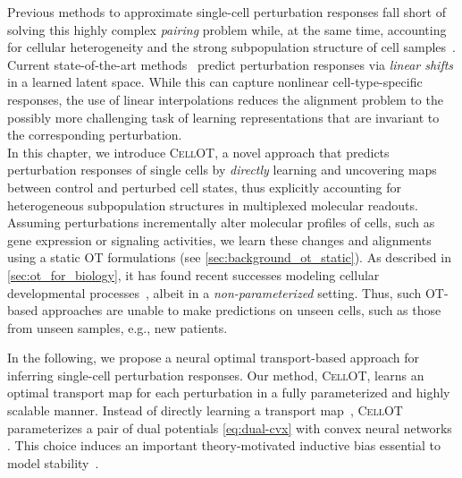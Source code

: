  Previous methods to approximate single-cell perturbation responses fall short of solving this highly complex \emph{pairing} problem while, at the same time, accounting for cellular heterogeneity and the strong subpopulation structure of cell samples~\citep{wu2021single,gonzalez2020tumor,li2022single}. 
Current state-of-the-art methods~\citep{lopez2018scvi, lotfollahi2019scgen, yang2020predicting} predict perturbation responses via \emph{linear shifts} in a learned %
latent space.
While this can capture nonlinear cell-type-specific responses, the use of linear interpolations reduces the alignment problem to the possibly more challenging task of learning representations that are invariant to the corresponding perturbation. \\

 In this chapter, we introduce \textsc{CellOT}, a novel approach that predicts perturbation responses of single cells by \emph{directly} learning and uncovering maps between control and perturbed cell states, thus explicitly accounting for heterogeneous subpopulation structures in multiplexed molecular readouts.
Assuming perturbations incrementally alter molecular profiles of cells, such as gene expression or signaling activities, we learn these changes and alignments using a static \acrlong{OT} formulations (see \cref{sec:background_ot_static}). 
As described in \cref{sec:ot_for_biology}, it has found recent successes modeling cellular developmental processes~\citep{lavenant2021towards, schiebinger2019optimal}, albeit in a {\em non-parameterized} setting. Thus, such OT-based approaches are unable to make predictions on unseen cells, such as those from unseen samples, e.g., new patients. 

 In the following, we propose a neural optimal transport-based approach for inferring single-cell perturbation responses. 
Our method, \textsc{CellOT}, learns an optimal transport map for each perturbation in a fully parameterized and highly scalable manner. Instead of directly learning a transport map~\citep{korotin2021wasserstein, yang2018scalable, prasad2020optimal}, \textsc{CellOT} parameterizes a pair of dual potentials \eqref{eq:dual-cvx} with convex neural networks \citep{amos2017input}. This choice induces an important theory-motivated inductive bias essential to model stability~\citep{makkuva2020optimal}. 

